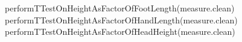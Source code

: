 \documentclass[]{article}
\newenvironment{Shaded}{\begin{snugshade}}{\end{snugshade}}
\newcommand{\FunctionTok}[1]{\textcolor[rgb]{0.00,0.00,0.00}{#1}}
\newcommand{\NormalTok}[1]{#1}
\begin{document}
\begin{Shaded}
\begin{Highlighting}[]
\FunctionTok{performTTestOnHeightAsFactorOfFootLength}\NormalTok{(measure.clean)}
\FunctionTok{performTTestOnHeightAsFactorOfHandLength}\NormalTok{(measure.clean)}
\FunctionTok{performTTestOnHeightAsFactorOfHeadHeight}\NormalTok{(measure.clean)}
\end{Highlighting}
\end{Shaded}







\newpage
\theendnotes

\newpage
\begin{auxmulticols}{1}
\singlespacing 


\end{auxmulticols}

\newpage
{
\hypersetup{linkcolor=black}
\setcounter{tocdepth}{3}
\tableofcontents
}
\end{document}

